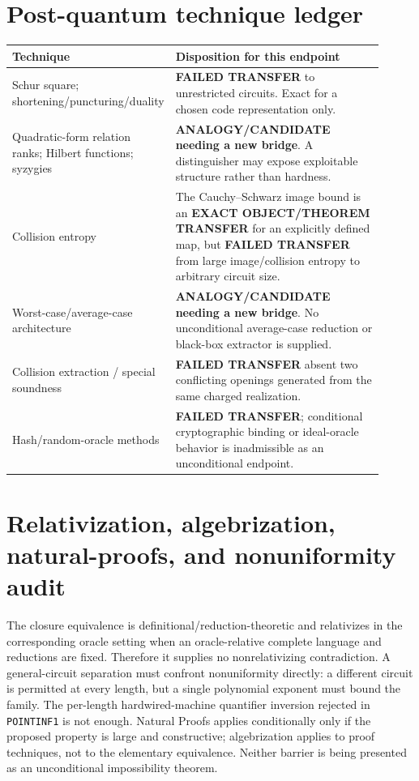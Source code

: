 \documentclass[11pt]{article}
\begin{document}
\section*{Post-quantum technique ledger}

\begin{longtable}{p{0.33\linewidth}p{0.58\linewidth}}
\toprule
\textbf{Technique} & \textbf{Disposition for this endpoint}\\
\midrule
Schur square; shortening/puncturing/duality & \textbf{FAILED TRANSFER} to unrestricted circuits.  Exact for a chosen code representation only.\\
Quadratic-form relation ranks; Hilbert functions; syzygies & \textbf{ANALOGY/CANDIDATE needing a new bridge}.  A distinguisher may expose exploitable structure rather than hardness.\\
Collision entropy & The Cauchy--Schwarz image bound is an \textbf{EXACT OBJECT/THEOREM TRANSFER} for an explicitly defined map, but \textbf{FAILED TRANSFER} from large image/collision entropy to arbitrary circuit size.\\
Worst-case/average-case architecture & \textbf{ANALOGY/CANDIDATE needing a new bridge}.  No unconditional average-case reduction or black-box extractor is supplied.\\
Collision extraction / special soundness & \textbf{FAILED TRANSFER} absent two conflicting openings generated from the same charged realization.\\
Hash/random-oracle methods & \textbf{FAILED TRANSFER}; conditional cryptographic binding or ideal-oracle behavior is inadmissible as an unconditional endpoint.\\
\bottomrule
\end{longtable}

\section*{Relativization, algebrization, natural-proofs, and nonuniformity audit}

The closure equivalence is definitional/reduction-theoretic and relativizes in the corresponding oracle setting when an oracle-relative complete language and reductions are fixed.  Therefore it supplies no nonrelativizing contradiction.  A general-circuit separation must confront nonuniformity directly: a different circuit is permitted at every length, but a single polynomial exponent must bound the family.  The per-length hardwired-machine quantifier inversion rejected in \texttt{POINTINF1} is not enough.  Natural Proofs applies conditionally only if the proposed property is large and constructive; algebrization applies to proof techniques, not to the elementary equivalence.  Neither barrier is being presented as an unconditional impossibility theorem.
\end{document}
